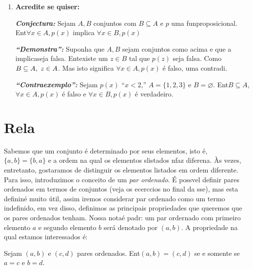 \begin{enumerate}[{\bf 1.}]
\item {\bf Acredite se quiser:}  

\noindent \textit{\textbf{Conjectura:}} Sejam $A,B$ conjuntos com $B\subseteq A$ e $p$ uma fun\cao proposicional. Ent\ao $\forall x\in A, p(x)$ implica $\forall x\in B, p(x)$  

\noindent \textit{\textbf{``Demonstra\caoi'':}} Suponha que $A,B$ sejam conjuntos como acima e que a implica\cao seja falsa. Ent\ao existe um $z\in B$ tal que $p(z)$ seja falsa. Como $B\subseteq A, \textrm{ } z\in A$. Mas isto significa $\forall x \in A, p(x)$ \'e falso, uma contradi\caoi. 

\noindent \textit{\textbf{``Contraexemplo'':}} Sejam $p(x)$ ``$x<2$,'' $A=\{1,2,3\}$ e $B=\varnothing$. Ent\ao $B\subseteq A$, $\forall x \in A, p(x)$ \'e falso e $\forall x \in B, p(x)$ \'e verdadeiro.
\end{enumerate}

\section{Rela\cois}\label{relacoes}


Sabemos que um conjunto \'e determinado por seus elementos, isto \'e, $\{a,b\}=\{b,a\}$ e a ordem na qual os elementos s\ao listados n\ao faz diferen\cc a. \`As vezes, entretanto, gostar\ih amos de distinguir os elementos listados em ordem diferente. Para isso, introduzimos o conceito de um {\it par ordenado}. \'E poss\ih vel definir pares ordenados em termos de conjuntos (veja os ecerc\ih cios no final da sse\caoi), mas esta defini\cao n\ao \'e muito \'util, assim iremos considerar par ordenado como um termo indefinido, em vez disso, definimos as principais propriedades que queremos que os pares ordenados tenham. Nossa nota\cao \'e padr\aoi: um par ordernado com primeiro elemento $a$ e segundo elemento $b$ ser\'a denotado por $(a,b)$. A propriedade na qual estamos interessados \'e:
\begin{definb}
Sejam $(a,b)$ e $(c,d)$ pares ordenados. Ent\ao $(a,b)=(c,d)$ se e somente se $a=c$ e $b=d$.
\end{definb}

